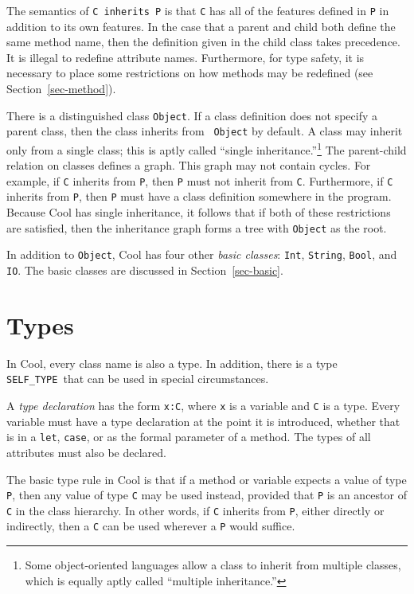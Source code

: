 \documentclass[11pt]{article}
\newcommand{\styp}{{\tt SELF\_TYPE}}
\begin{document}
The semantics of {\tt C inherits P} is that {\tt C} has all of the
features defined in {\tt P} in addition to its own features.
In the case that a parent and child both define the same method
name, then the definition given in the child class takes precedence.
It is illegal to redefine attribute names.  Furthermore, for type safety,
it is necessary to place some restrictions on how methods may be redefined
(see Section~\ref{sec-method}).

There is a distinguished class {\tt Object}.  If a class definition
does not specify a parent class, then the class inherits from {\tt
Object} by default.  A class may inherit only from a single class;
this is aptly called ``single inheritance.''\footnote{Some
object-oriented languages allow a class to inherit from multiple
classes, which is equally aptly called ``multiple inheritance.''} The
parent-child relation on classes defines a graph.  This graph may not
contain cycles.  For example, if {\tt C} inherits from {\tt P}, then
{\tt P} must not inherit from {\tt C}.  Furthermore, if {\tt C}
inherits from {\tt P}, then {\tt P} must have a class definition
somewhere in the program.  Because Cool has single inheritance,
it follows that if both of these restrictions are
satisfied, then the inheritance graph forms a tree with {\tt Object}
as the root.

In addition to {\tt Object}, Cool has four other {\em basic classes}:
	{\tt Int}, {\tt String}, {\tt Bool}, and {\tt IO}.
The basic classes are discussed in Section~\ref{sec-basic}.

\section{Types}

In Cool, every class name is also a type.  In addition, there is a
type \styp\ that can be used in special circumstances.

A {\em type declaration} has the form {\tt x:C}, where {\tt x} is a variable
and {\tt C} is a type.  Every variable must have a type declaration at the
point it is introduced, whether that is in a {\tt let}, {\tt case}, or as
the formal parameter of a method.  The types of all attributes must also be
declared.

The basic type rule in Cool is that if a method or variable expects a value
of type {\tt P}, then any value of type {\tt C} may be used instead, provided
that {\tt P} is an ancestor of {\tt C} in the class hierarchy.  In other
words, if {\tt C} inherits from {\tt P}, either directly or indirectly, then
a {\tt C} can be used wherever a {\tt P} would suffice.
\end{document}
